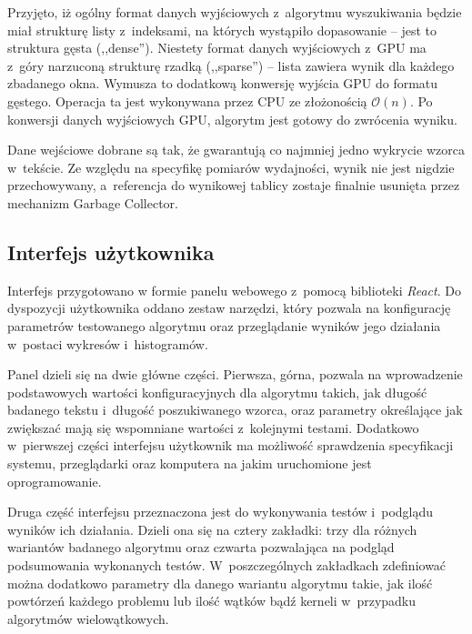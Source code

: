 Przyjęto, iż ogólny format danych wyjściowych z~algorytmu wyszukiwania będzie miał strukturę listy z~indeksami, na których wystąpiło dopasowanie -- jest to struktura gęsta (,,dense''). Niestety format danych wyjściowych z~GPU ma z~góry narzuconą strukturę rzadką (,,sparse'') -- lista zawiera wynik dla każdego zbadanego okna. Wymusza to dodatkową konwersję wyjścia GPU do formatu gęstego. Operacja ta jest wykonywana przez CPU ze złożonością $\mathcal{O}(n)$. Po konwersji danych wyjściowych GPU, algorytm jest gotowy do zwrócenia wyniku.

Dane wejściowe dobrane są tak, że gwarantują co najmniej jedno wykrycie wzorca w~tekście. Ze względu na specyfikę pomiarów wydajności, wynik nie jest nigdzie przechowywany, a~referencja do wynikowej tablicy zostaje finalnie usunięta przez mechanizm Garbage Collector.


\subsection{Interfejs użytkownika}

Interfejs przygotowano w formie panelu webowego z~pomocą biblioteki \emph{React}. Do dyspozycji użytkownika oddano zestaw narzędzi, który pozwala na konfigurację parametrów testowanego algorytmu oraz przeglądanie wyników jego działania w~postaci wykresów i~histogramów. 

Panel dzieli się na dwie główne części. Pierwsza, górna, pozwala na wprowadzenie podstawowych wartości konfiguracyjnych dla algorytmu takich, jak długość badanego tekstu i~długość poszukiwanego wzorca, oraz parametry określające jak zwiększać mają się wspomniane wartości z~kolejnymi testami. Dodatkowo w~pierwszej części interfejsu użytkownik ma możliwość sprawdzenia specyfikacji systemu, przeglądarki oraz komputera na jakim uruchomione jest oprogramowanie. 

Druga część interfejsu przeznaczona jest do wykonywania testów i~podglądu wyników ich działania. Dzieli ona się na cztery zakładki: trzy dla różnych wariantów badanego algorytmu oraz czwarta pozwalająca na podgląd podsumowania wykonanych testów. W~poszczególnych zakładkach zdefiniować można dodatkowo parametry dla danego wariantu algorytmu takie, jak ilość powtórzeń każdego problemu lub ilość wątków bądź kerneli w~przypadku algorytmów wielowątkowych. 

